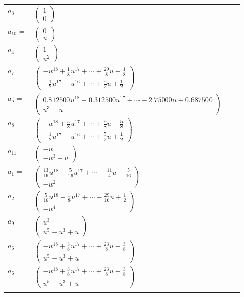 \documentclass[1p]{elsarticle_modified}
\theoremstyle{definition}
\begin{document}
\begin{tabular}{m{7pt} m{180pt} m{7pt} m{180pt} }
\flushright $a_{3}=$&$\begin{pmatrix}1\\0\end{pmatrix}$ \\
\flushright $a_{10}=$&$\begin{pmatrix}0\\u\end{pmatrix}$ \\
\flushright $a_{4}=$&$\begin{pmatrix}1\\u^2\end{pmatrix}$ \\
\flushright $a_{7}=$&$\begin{pmatrix}- u^{18}+\frac{1}{8} u^{17}+\cdots+\frac{29}{8} u-\frac{1}{8}\\-\frac{1}{2} u^{17}+u^{16}+\cdots+\frac{5}{2} u+\frac{1}{2}\end{pmatrix}$ \\
\flushright $a_{5}=$&$\begin{pmatrix}0.812500 u^{18}-0.312500 u^{17}+\cdots-2.75000 u+0.687500\\u^3- u\end{pmatrix}$ \\
\flushright $a_{8}=$&$\begin{pmatrix}- u^{18}+\frac{5}{8} u^{17}+\cdots+\frac{9}{8} u-\frac{5}{8}\\-\frac{1}{2} u^{17}+u^{16}+\cdots+\frac{5}{2} u+\frac{1}{2}\end{pmatrix}$ \\
\flushright $a_{11}=$&$\begin{pmatrix}- u\\- u^3+u\end{pmatrix}$ \\
\flushright $a_{1}=$&$\begin{pmatrix}\frac{13}{16} u^{18}-\frac{5}{16} u^{17}+\cdots-\frac{11}{4} u-\frac{5}{16}\\- u^2\end{pmatrix}$ \\
\flushright $a_{2}=$&$\begin{pmatrix}\frac{5}{16} u^{18}-\frac{1}{8} u^{17}+\cdots-\frac{29}{16} u+\frac{1}{2}\\- u^4\end{pmatrix}$ \\
\flushright $a_{9}=$&$\begin{pmatrix}u^3\\u^5- u^3+u\end{pmatrix}$ \\
\flushright $a_{6}=$&$\begin{pmatrix}- u^{18}+\frac{3}{8} u^{17}+\cdots+\frac{23}{8} u-\frac{3}{8}\\u^5- u^3+u\end{pmatrix}$\\ \flushright $a_{6}=$&$\begin{pmatrix}- u^{18}+\frac{3}{8} u^{17}+\cdots+\frac{23}{8} u-\frac{3}{8}\\u^5- u^3+u\end{pmatrix}$\\&\end{tabular}
\end{document}
